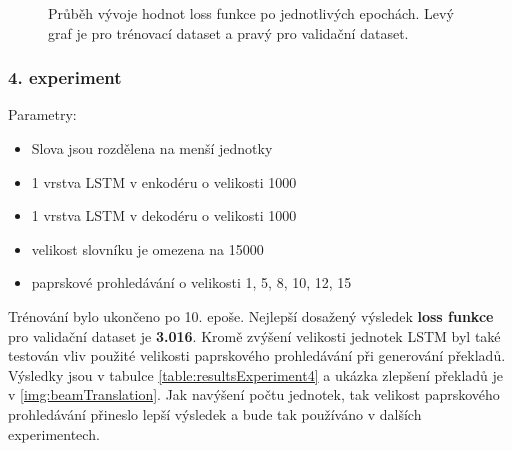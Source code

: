 \begin{figure}[H]
    \begin{center}
    \end{center}
	\caption{Průběh vývoje hodnot loss funkce po jednotlivých epochách. Levý graf je pro trénovací dataset a pravý pro validační dataset.}
\end{figure}

\subsubsection{4. experiment}\label{experiment4}
Parametry:
\begin{itemize}
  \item Slova jsou rozdělena na menší jednotky
  \item 1 vrstva LSTM v enkodéru o velikosti 1000
  \item 1 vrstva LSTM v dekodéru o velikosti 1000
  \item velikost slovníku je omezena na 15000
  \item paprskové prohledávání o velikosti 1, 5, 8, 10, 12, 15
\end{itemize}

Trénování bylo ukončeno po 10. epoše. Nejlepší dosažený výsledek \textbf{loss funkce} pro validační dataset je \textbf{3.016}. Kromě zvýšení velikosti jednotek LSTM byl také testován vliv použité velikosti paprskového prohledávání při generování překladů. Výsledky jsou v tabulce \ref{table:resultsExperiment4} a ukázka zlepšení překladů je v \ref{img:beamTranslation}. Jak navýšení počtu jednotek, tak velikost paprskového prohledávání přineslo lepší výsledek a bude tak používáno v dalších experimentech.

